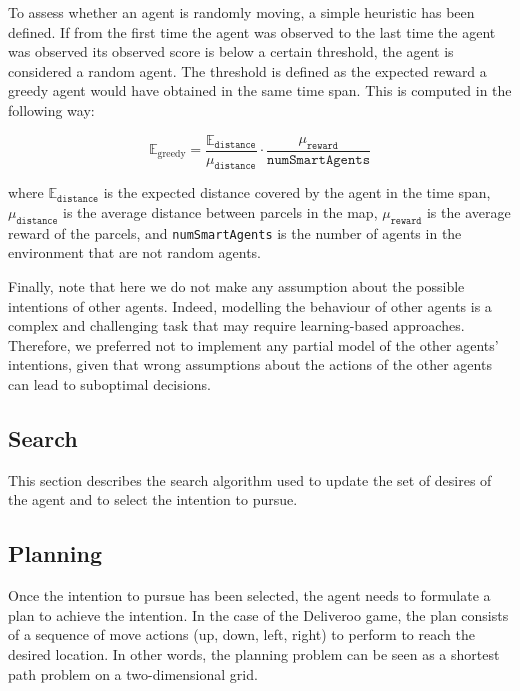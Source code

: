 To assess whether an agent is randomly moving, a simple heuristic has been defined. If from the first time the agent was observed to the last time the agent was observed its observed score is below a certain threshold, the agent is considered a random agent. The threshold is defined as the expected reward a greedy agent would have obtained in the same time span. This is computed in the following way:

\begin{equation*}
    \mathbb{E}_{\text{greedy}} = \frac{\mathbb{E}_{\texttt{distance}}}{\mu_{\texttt{distance}}} \cdot \frac{\mu_{\texttt{reward}}}{\texttt{numSmartAgents}}
\end{equation*}

where $\mathbb{E}_{\texttt{distance}}$ is the expected distance covered by the agent in the time span, $\mu_{\texttt{distance}}$ is the average distance between parcels in the map, $\mu_{\texttt{reward}}$ is the average reward of the parcels, and \texttt{numSmartAgents} is the number of agents in the environment that are not random agents.

Finally, note that here we do not make any assumption about the possible intentions of other agents. Indeed, modelling the behaviour of other agents is a complex and challenging task that may require learning-based approaches. Therefore, we preferred not to implement any partial model of the other agents' intentions, given that wrong assumptions about the actions of the other agents can lead to suboptimal decisions.

\subsection{Search}

This section describes the search algorithm used to update the set of desires of the agent and to select the intention to pursue.

\subsection{Planning}

Once the intention to pursue has been selected, the agent needs to formulate a plan to achieve the intention. In the case of the Deliveroo game, the plan consists of a sequence of move actions (up, down, left, right) to perform to reach the desired location. In other words, the planning problem can be seen as a shortest path problem on a two-dimensional grid.

